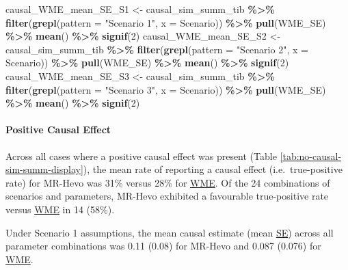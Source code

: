 \documentclass[
]{article}
\newenvironment{Shaded}{\begin{snugshade}}{\end{snugshade}}
\newcommand{\AttributeTok}[1]{\textcolor[rgb]{0.13,0.29,0.53}{#1}}
\newcommand{\DecValTok}[1]{\textcolor[rgb]{0.00,0.00,0.81}{#1}}
\newcommand{\FunctionTok}[1]{\textcolor[rgb]{0.13,0.29,0.53}{\textbf{#1}}}
\newcommand{\NormalTok}[1]{#1}
\newcommand{\OtherTok}[1]{\textcolor[rgb]{0.56,0.35,0.01}{#1}}
\newcommand{\SpecialCharTok}[1]{\textcolor[rgb]{0.81,0.36,0.00}{\textbf{#1}}}
\newcommand{\StringTok}[1]{\textcolor[rgb]{0.31,0.60,0.02}{#1}}
\begin{document}
\begin{Shaded}
\begin{Highlighting}[]
\NormalTok{causal\_WME\_mean\_SE\_S1 }\OtherTok{\textless{}{-}}\NormalTok{  causal\_sim\_summ\_tib }\SpecialCharTok{\%\textgreater{}\%} \FunctionTok{filter}\NormalTok{(}\FunctionTok{grepl}\NormalTok{(}\AttributeTok{pattern =} \StringTok{"Scenario 1"}\NormalTok{, }\AttributeTok{x =}\NormalTok{ Scenario)) }\SpecialCharTok{\%\textgreater{}\%} \FunctionTok{pull}\NormalTok{(WME\_SE) }\SpecialCharTok{\%\textgreater{}\%} \FunctionTok{mean}\NormalTok{() }\SpecialCharTok{\%\textgreater{}\%} \FunctionTok{signif}\NormalTok{(}\DecValTok{2}\NormalTok{)}
\NormalTok{causal\_WME\_mean\_SE\_S2 }\OtherTok{\textless{}{-}}\NormalTok{  causal\_sim\_summ\_tib }\SpecialCharTok{\%\textgreater{}\%} \FunctionTok{filter}\NormalTok{(}\FunctionTok{grepl}\NormalTok{(}\AttributeTok{pattern =} \StringTok{"Scenario 2"}\NormalTok{, }\AttributeTok{x =}\NormalTok{ Scenario)) }\SpecialCharTok{\%\textgreater{}\%} \FunctionTok{pull}\NormalTok{(WME\_SE) }\SpecialCharTok{\%\textgreater{}\%} \FunctionTok{mean}\NormalTok{() }\SpecialCharTok{\%\textgreater{}\%} \FunctionTok{signif}\NormalTok{(}\DecValTok{2}\NormalTok{)}
\NormalTok{causal\_WME\_mean\_SE\_S3 }\OtherTok{\textless{}{-}}\NormalTok{  causal\_sim\_summ\_tib }\SpecialCharTok{\%\textgreater{}\%} \FunctionTok{filter}\NormalTok{(}\FunctionTok{grepl}\NormalTok{(}\AttributeTok{pattern =} \StringTok{"Scenario 3"}\NormalTok{, }\AttributeTok{x =}\NormalTok{ Scenario)) }\SpecialCharTok{\%\textgreater{}\%} \FunctionTok{pull}\NormalTok{(WME\_SE) }\SpecialCharTok{\%\textgreater{}\%} \FunctionTok{mean}\NormalTok{() }\SpecialCharTok{\%\textgreater{}\%} \FunctionTok{signif}\NormalTok{(}\DecValTok{2}\NormalTok{)}
\end{Highlighting}
\end{Shaded}

\paragraph{Positive Causal Effect}\label{results-sim-causal}

\leavevmode\newline Across all cases where a positive causal effect was present (Table \ref{tab:no-causal-sim-summ-display}), the mean rate of reporting a causal effect (i.e.~true-positive rate) for MR-Hevo was 31\% versus 28\% for \hyperref[acronyms_WME]{WME}. Of the 24 combinations of scenarios and parameters, MR-Hevo exhibited a favourable true-positive rate versus \hyperref[acronyms_WME]{WME} in 14 (58\%).

Under Scenario 1 assumptions, the mean causal estimate (mean \hyperref[acronyms_SE]{SE}) across all parameter combinations was 0.11 (0.08) for MR-Hevo and 0.087 (0.076) for \hyperref[acronyms_WME]{WME}.
\end{document}
